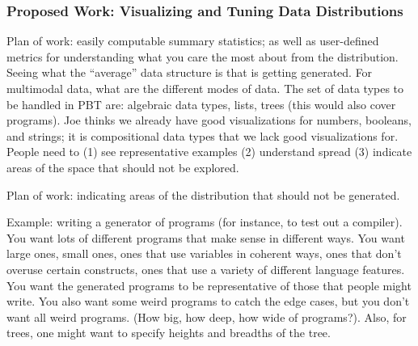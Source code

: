 \subsubsection{Proposed Work: Visualizing and Tuning Data Distributions}

Plan of work: easily computable summary statistics; as well as user-defined
metrics for understanding what you care the most about from the distribution.
Seeing what the “average” data structure is that is getting generated. For
multimodal data, what are the different modes of data. The set of data types to
be handled in PBT are: algebraic data types, lists, trees (this would also cover
programs). Joe thinks we already have good visualizations for numbers, booleans,
and strings; it is compositional data types that we lack good visualizations
for. People need to (1) see representative examples (2) understand spread (3)
indicate areas of the space that should not be explored.   

Plan of work: indicating areas of the distribution that should not be generated.

Example: writing a generator of programs (for instance, to test out a compiler).
You want lots of different programs that make sense in different ways. You want
large ones, small ones, ones that use variables in coherent ways, ones that
don’t overuse certain constructs, ones that use a variety of different language
features. You want the generated programs to be representative of those that
people might write. You also want some weird programs to catch the edge cases,
but you don’t want all weird programs. (How big, how deep, how wide of
programs?). Also, for trees, one might want to specify heights and breadths of
the tree.


